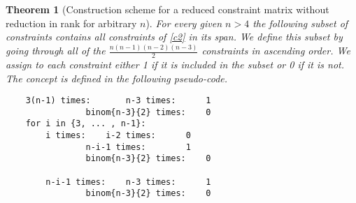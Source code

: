 \documentclass{scrartcl}
\newtheorem{theorem}{Theorem}
\theoremstyle{plain}
\begin{document}
\newpage
\begin{mdframed}
\begin{theorem}[Construction scheme for a reduced constraint matrix without reduction in rank for arbitrary $n$] \label{construction}
	For every given $n>4$ the following subset of constraints contains all constraints of \eqref{c2} in its span. We define this subset by going through all of the $\frac{n(n-1)(n-2)(n-3)}{2}$ constraints in ascending order. We assign to each constraint either 1 if it is included in the subset or 0 if it is not. The concept is defined in the following pseudo-code.
	
	\begin{lstlisting}
	3(n-1) times: 		n-3 times:		1
				binom{n-3}{2} times:	0
	for i in {3, ... , n-1}:
		i times:	i-2 times:		0
				n-i-1 times:		1
				binom{n-3}{2} times:	0
							
		n-i-1 times: 	n-3 times:		1
				binom{n-3}{2} times:	0			
	\end{lstlisting}
\end{theorem}
\vspace{7pt}
\end{mdframed}
\end{document}
